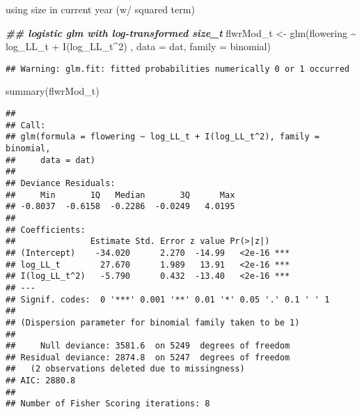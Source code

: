 \documentclass[
]{article}
\newenvironment{Shaded}{\begin{snugshade}}{\end{snugshade}}
\newcommand{\AttributeTok}[1]{\textcolor[rgb]{0.77,0.63,0.00}{#1}}
\newcommand{\DecValTok}[1]{\textcolor[rgb]{0.00,0.00,0.81}{#1}}
\newcommand{\DocumentationTok}[1]{\textcolor[rgb]{0.56,0.35,0.01}{\textbf{\textit{#1}}}}
\newcommand{\FunctionTok}[1]{\textcolor[rgb]{0.00,0.00,0.00}{#1}}
\newcommand{\NormalTok}[1]{#1}
\newcommand{\OtherTok}[1]{\textcolor[rgb]{0.56,0.35,0.01}{#1}}
\newcommand{\SpecialCharTok}[1]{\textcolor[rgb]{0.00,0.00,0.00}{#1}}
\begin{document}
using size in current year (w/ squared term)

\begin{Shaded}
\begin{Highlighting}[]
\DocumentationTok{\#\# logistic glm with log{-}transformed size\_t}
\NormalTok{flwrMod\_t }\OtherTok{\textless{}{-}} \FunctionTok{glm}\NormalTok{(flowering }\SpecialCharTok{\textasciitilde{}}\NormalTok{ log\_LL\_t }\SpecialCharTok{+} \FunctionTok{I}\NormalTok{(log\_LL\_t}\SpecialCharTok{\^{}}\DecValTok{2}\NormalTok{) , }\AttributeTok{data =}\NormalTok{ dat, }\AttributeTok{family =}\NormalTok{ binomial)}
\end{Highlighting}
\end{Shaded}

\begin{verbatim}
## Warning: glm.fit: fitted probabilities numerically 0 or 1 occurred
\end{verbatim}

\begin{Shaded}
\begin{Highlighting}[]
\FunctionTok{summary}\NormalTok{(flwrMod\_t)}
\end{Highlighting}
\end{Shaded}

\begin{verbatim}
## 
## Call:
## glm(formula = flowering ~ log_LL_t + I(log_LL_t^2), family = binomial, 
##     data = dat)
## 
## Deviance Residuals: 
##     Min       1Q   Median       3Q      Max  
## -0.8037  -0.6158  -0.2286  -0.0249   4.0195  
## 
## Coefficients:
##               Estimate Std. Error z value Pr(>|z|)    
## (Intercept)    -34.020      2.270  -14.99   <2e-16 ***
## log_LL_t        27.670      1.989   13.91   <2e-16 ***
## I(log_LL_t^2)   -5.790      0.432  -13.40   <2e-16 ***
## ---
## Signif. codes:  0 '***' 0.001 '**' 0.01 '*' 0.05 '.' 0.1 ' ' 1
## 
## (Dispersion parameter for binomial family taken to be 1)
## 
##     Null deviance: 3581.6  on 5249  degrees of freedom
## Residual deviance: 2874.8  on 5247  degrees of freedom
##   (2 observations deleted due to missingness)
## AIC: 2880.8
## 
## Number of Fisher Scoring iterations: 8
\end{verbatim}
\end{document}
